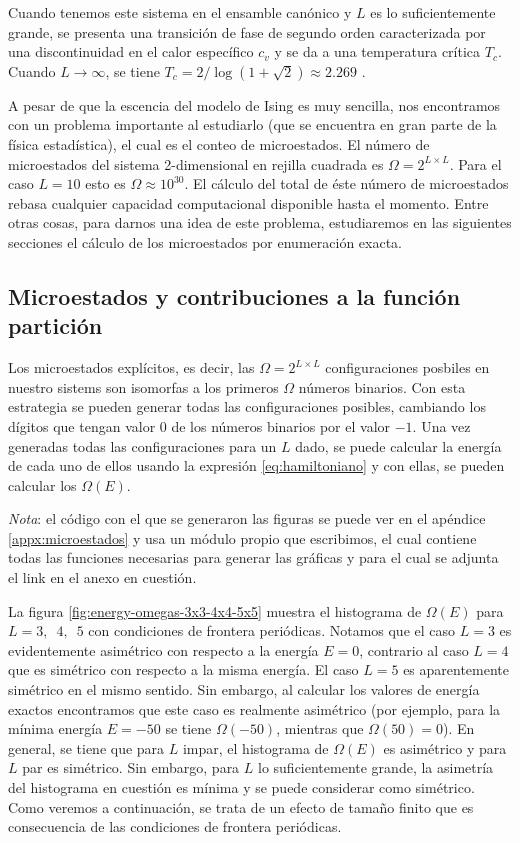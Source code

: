 \documentclass[%
 reprint,
 amsmath,amssymb,
 aps,
 pra,
]{revtex4-2}
\begin{document}
	Cuando tenemos este sistema en el ensamble canónico y $L$ es lo suficientemente grande, se presenta una transición de fase de segundo orden caracterizada por una discontinuidad en el calor específico $c_v$ y se da a una temperatura crítica $T_c$. Cuando $L\rightarrow\infty$, se tiene $T_c = 2 / \log\left( 1 + \sqrt{2} \right) \approx 2.269$ \cite{Huang}.

	A pesar de que la escencia del modelo de Ising es muy sencilla, nos encontramos con un problema importante al estudiarlo (que se encuentra en gran parte de la física estadística), el cual es el conteo de microestados. El número de microestados del sistema 2-dimensional en rejilla cuadrada es $\Omega = 2^{L \times L}$. Para el caso $L=10$ esto es $\Omega \approx 10^{30} $. El cálculo del total de éste número de microestados rebasa cualquier capacidad computacional disponible hasta el momento.
	Entre otras cosas, para darnos una idea de este problema, estudiaremos en las siguientes secciones el cálculo de los microestados por enumeración exacta.

	\subsection{Microestados y contribuciones a la función partición\label{subsec:teoria-contribuciones-Z}}

	Los microestados explícitos, es decir, las $\Omega = 2^{L \times L}$ configuraciones posbiles en nuestro sistems son isomorfas a los primeros $\Omega$ números binarios. Con esta estrategia se pueden generar todas las configuraciones posibles, cambiando los dígitos que tengan valor $0$ de los números binarios por el valor $-1$. Una vez generadas todas las configuraciones para un $L$ dado, se puede calcular la energía de cada uno de ellos usando la expresión \ref{eq:hamiltoniano} y con ellas, se pueden calcular los $\Omega(E)$.

	\textit{Nota}: el código con el que se generaron las figuras se puede ver en el apéndice \ref{appx:microestados} y usa un módulo propio que escribimos, el cual contiene todas las funciones necesarias para generar las gráficas y para el cual se adjunta el link en el anexo en cuestión.

	La figura \ref{fig:energy-omegas-3x3-4x4-5x5} muestra el histograma de $\Omega(E)$ para $L = 3, \,\,\,4, \,\,\,5$ con condiciones de frontera periódicas. Notamos que el caso $L=3$ es evidentemente asimétrico con respecto a la energía $E=0$, contrario al caso $L=4$ que es simétrico con respecto a la misma energía. El caso $L=5$ es aparentemente simétrico en el mismo sentido. Sin embargo, al calcular los valores de energía exactos encontramos que este caso es realmente asimétrico (por ejemplo, para la mínima energía $E=-50$ se tiene $\Omega(-50)$, mientras que $\Omega(50)=0$). En general, se tiene que para $L$ impar, el histograma de $\Omega(E)$ es asimétrico y para $L$ par es simétrico. Sin embargo, para $L$ lo suficientemente grande, la asimetría del histograma en cuestión es mínima y se puede considerar como simétrico. Como veremos a continuación, se trata de un efecto de tamaño finito que es consecuencia de las condiciones de frontera periódicas. 
	
\end{document}
